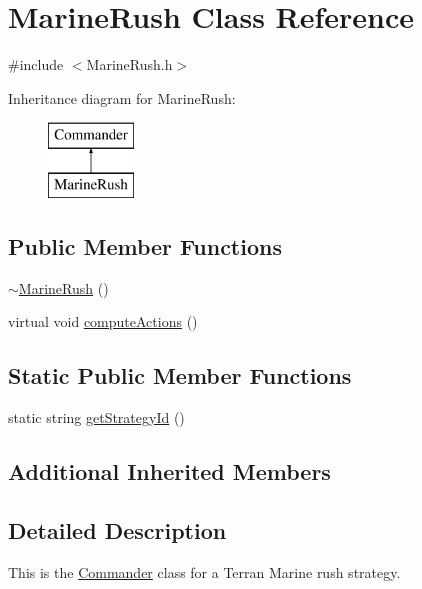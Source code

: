 \hypertarget{class_marine_rush}{\section{Marine\-Rush Class Reference}
\label{class_marine_rush}
}


{\ttfamily \#include $<$Marine\-Rush.\-h$>$}

Inheritance diagram for Marine\-Rush\-:\begin{figure}[H]
\begin{center}
\leavevmode
\includegraphics[height=2.000000cm]{class_marine_rush}
\end{center}
\end{figure}
\subsection*{Public Member Functions}
\begin{DoxyCompactItemize}
\item 
\hyperlink{class_marine_rush_a67d509497a90607b1c5a2dc808579d58}{$\sim$\-Marine\-Rush} ()
\item 
virtual void \hyperlink{class_marine_rush_a40179620a326c69bd840fa28e5be8ce4}{compute\-Actions} ()
\end{DoxyCompactItemize}
\subsection*{Static Public Member Functions}
\begin{DoxyCompactItemize}
\item 
static string \hyperlink{class_marine_rush_a67b6aaa27f10396bbc6fffac00cbccad}{get\-Strategy\-Id} ()
\end{DoxyCompactItemize}
\subsection*{Additional Inherited Members}


\subsection{Detailed Description}
This is the \hyperlink{class_commander}{Commander} class for a Terran Marine rush strategy.

